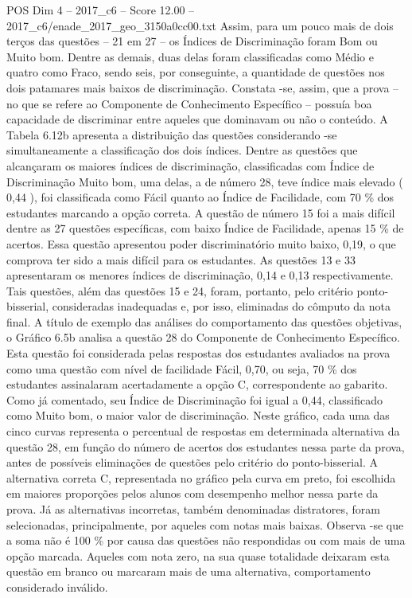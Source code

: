\begin{textsample}{POS Dim 4 – 2017\_c6 – Score 12.00 – 2017\_c6/enade\_2017\_geo\_3150a0cc00.txt}
Assim, para um pouco mais de dois terços das questões – 21 em 27 – os Índices de Discriminação foram Bom ou Muito bom.
Dentre as demais, duas delas foram classificadas como Médio e quatro como Fraco, sendo seis, por conseguinte, a quantidade de questões nos dois patamares mais baixos de discriminação.
Constata -se, assim, que a prova – no que se refere ao Componente de Conhecimento Específico – possuía boa capacidade de discriminar entre aqueles que dominavam ou não o conteúdo.
A Tabela 6.12b apresenta a distribuição das questões considerando -se simultaneamente a classificação dos dois índices.
Dentre as questões que alcançaram os maiores índices de discriminação, classificadas com Índice de Discriminação Muito bom, uma delas, a de número 28, teve índice mais elevado ( 0,44 ), foi classificada como Fácil quanto ao Índice de Facilidade, com 70 \% dos estudantes marcando a opção correta.
A questão de número 15 foi a mais difícil dentre as 27 questões específicas, com baixo Índice de Facilidade, apenas 15 \% de acertos.
Essa questão apresentou poder discriminatório muito baixo, 0,19, o que comprova ter sido a mais difícil para os estudantes.
As questões 13 e 33 apresentaram os menores índices de discriminação, 0,14 e 0,13 respectivamente.
Tais questões, além das questões 15 e 24, foram, portanto, pelo critério ponto-bisserial, consideradas inadequadas e, por isso, eliminadas do cômputo da nota final.
A título de exemplo das análises do comportamento das questões objetivas, o Gráfico 6.5b analisa a questão 28 do Componente de Conhecimento Específico.
Esta questão foi considerada pelas respostas dos estudantes avaliados na prova como uma questão com nível de facilidade Fácil, 0,70, ou seja, 70 \% dos estudantes assinalaram acertadamente a opção C, correspondente ao gabarito.
Como já comentado, seu Índice de Discriminação foi igual a 0,44, classificado como Muito bom, o maior valor de discriminação.
Neste gráfico, cada uma das cinco curvas representa o percentual de respostas em determinada alternativa da questão 28, em função do número de acertos dos estudantes nessa parte da prova, antes de possíveis eliminações de questões pelo critério do ponto-bisserial.
A alternativa correta C, representada no gráfico pela curva em preto, foi escolhida em maiores proporções pelos alunos com desempenho melhor nessa parte da prova.
Já as alternativas incorretas, também denominadas distratores, foram selecionadas, principalmente, por aqueles com notas mais baixas.
Observa -se que a soma não é 100 \% por causa das questões não respondidas ou com mais de uma opção marcada.
Aqueles com nota zero, na sua quase totalidade deixaram esta questão em branco ou marcaram mais de uma alternativa, comportamento considerado inválido.

\end{textsample}

